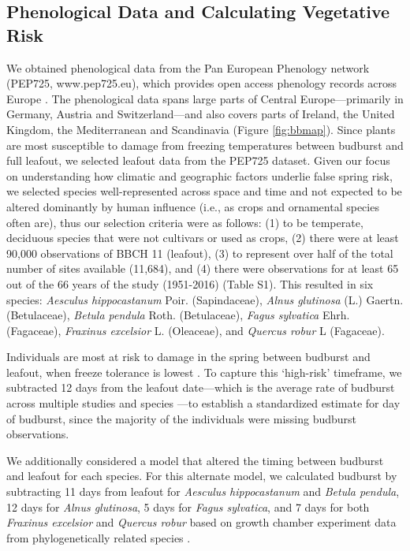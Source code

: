 \documentclass{article}\usepackage[]{graphicx}\usepackage[]{color}
\begin{document}
\subsection*{Phenological Data and Calculating Vegetative Risk}
We obtained phenological data from the Pan European Phenology network (PEP725, www.pep725.eu), which provides open access phenology records across Europe \citep{Templ2018}. The phenological data spans large parts of Central Europe---primarily in Germany, Austria and Switzerland---and also covers parts of Ireland, the United Kingdom, the Mediterranean and Scandinavia (Figure \ref{fig:bbmap}). Since plants are most susceptible to damage from freezing temperatures between budburst and full leafout, we selected leafout data \citep[i.e., in][BBCH 11, which is defined as the point of leaf unfolding and the first visible leaf stalk]{Meier2001} from the PEP725 dataset. Given our focus on understanding how climatic and geographic factors underlie false spring risk, we selected species well-represented across space and time and not expected to be altered dominantly by human influence (i.e., as crops and ornamental species often are), thus our selection criteria were as follows: (1) to be temperate, deciduous species that were not cultivars or used as crops, (2) there were at least 90,000 observations of BBCH 11 (leafout), (3) to represent over half of the total number of sites available (11,684), and (4) there were observations for at least 65 out of the 66 years of the study (1951-2016) (Table S1). This resulted in six species: \textit{Aesculus hippocastanum} Poir. (Sapindaceae), \textit{Alnus glutinosa} (L.) Gaertn. (Betulaceae), \textit{Betula pendula} Roth. (Betulaceae), \textit{Fagus sylvatica} Ehrh. (Fagaceae), \textit{Fraxinus excelsior} L. (Oleaceae), and \textit{Quercus robur} L (Fagaceae). 

Individuals are most at risk to damage in the spring between budburst and leafout, when freeze tolerance is lowest \citep{Sakai1987}. To capture this `high-risk' timeframe, we subtracted 12 days from the leafout date---which is the average rate of budburst across multiple studies and species \citep{Donnelly2017,Flynn2018,NPN2019}---to establish a standardized estimate for day of budburst, since the majority of the individuals were missing budburst observations. 

We additionally considered a model that altered the timing between budburst and leafout for each species. For this alternate model, we calculated budburst by subtracting 11 days from leafout for \textit{Aesculus hippocastanum} and \textit{Betula pendula}, 12 days for \textit{Alnus glutinosa}, 5 days for \textit{Fagus sylvatica}, and 7 days for both \textit{Fraxinus excelsior} and \textit{Quercus robur} based on growth chamber experiment data from phylogenetically related species \citep{Buerki2010,Wang2016,  Hipp2017,Flynn2018}.
\end{document}
